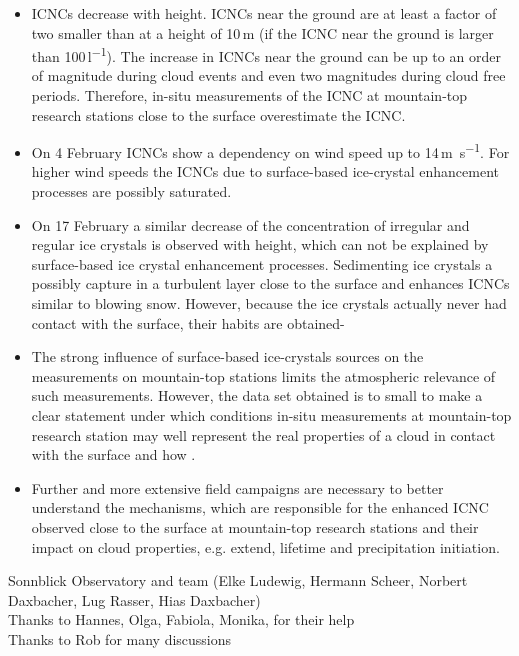 \documentclass[draft,linenumbers]{agujournal}
\begin{document}
\begin{itemize}
\item ICNCs decrease with height. ICNCs near the ground are at least a factor of two smaller than at a height of 10\,\si{m} (if the ICNC near the ground is larger than 100\,\si{l^{-1}}). The increase in ICNCs near the ground can be up to an order of magnitude during cloud events and even two magnitudes during cloud free periods. Therefore, in-situ measurements of the ICNC at mountain-top research stations close to the surface overestimate the ICNC.
\item On 4 February ICNCs show a dependency on wind speed up to 14\,\si{m s^{-1}}. For higher wind speeds the ICNCs due   to surface-based ice-crystal enhancement processes are possibly saturated.
\item On 17 February a similar decrease of the concentration of irregular and regular ice crystals is observed with height, which can not be explained by surface-based ice crystal enhancement processes. Sedimenting ice crystals a possibly capture in a turbulent layer close to the surface and enhances ICNCs similar to blowing snow. However, because the ice crystals actually never had contact with the surface, their habits are obtained-
\item The strong influence of surface-based ice-crystals sources on the measurements on mountain-top stations limits the atmospheric relevance of such measurements. However, the data set obtained is to small to make a clear statement under which conditions in-situ measurements at mountain-top research station may well represent the real properties of a cloud in contact with the surface and how .
\item Further and more extensive field campaigns are necessary to better understand the mechanisms, which are responsible for the enhanced ICNC observed close to the surface at mountain-top research stations and their impact on cloud properties, e.g. extend, lifetime and precipitation initiation.
\end{itemize}
\label{Summary}



\begin{acronyms}
\end{acronyms}


\acknowledgments
Sonnblick Observatory and team (Elke Ludewig, Hermann Scheer, Norbert Daxbacher, Lug Rasser, Hias Daxbacher)\\
Thanks to Hannes, Olga, Fabiola, Monika, for their help\\
Thanks to Rob for many discussions
\end{document}
